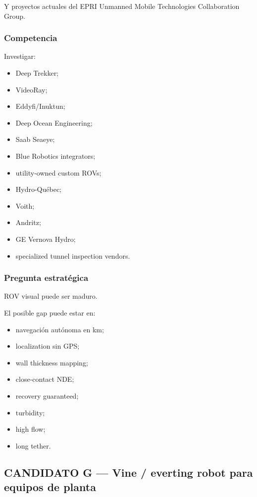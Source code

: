 \documentclass[11pt,a4paper]{article}
\begin{document}
Y proyectos actuales del EPRI Unmanned Mobile Technologies Collaboration Group.


\subsubsection*{Competencia}
Investigar:

\begin{itemize}
\item Deep Trekker;
\item VideoRay;
\item Eddyfi/Inuktun;
\item Deep Ocean Engineering;
\item Saab Seaeye;
\item Blue Robotics integrators;
\item utility-owned custom ROVs;
\item Hydro-Québec;
\item Voith;
\item Andritz;
\item GE Vernova Hydro;
\item specialized tunnel inspection vendors.
\end{itemize}


\subsubsection*{Pregunta estratégica}
ROV visual puede ser maduro.

El posible gap puede estar en:

\begin{itemize}
\item navegación autónoma en km;
\item localization sin GPS;
\item wall thickness mapping;
\item close-contact NDE;
\item recovery guaranteed;
\item turbidity;
\item high flow;
\item long tether.
\end{itemize}


\subsection*{CANDIDATO G — Vine / everting robot para equipos de planta}
\end{document}
